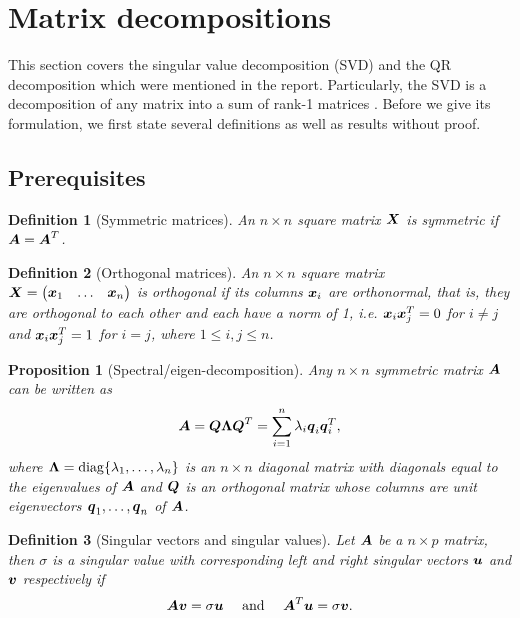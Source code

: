 \documentclass[12pt]{article}
\newtheorem{prop}{Proposition}[section]
\newtheorem{dfn}{Definition}[section]
\DeclareMathOperator{\diag}{diag}
\begin{document}
	\pagebreak
	
	\appendix %
	\section{\label{sec:svd}Matrix decompositions}
	This section covers the singular value decomposition (SVD) and the QR decomposition which were mentioned in the report. Particularly, the SVD is a decomposition of any matrix into a sum of rank-1 matrices \cite{Strang2019}. Before we give its formulation, we first state several definitions as well as results without proof.
	\subsection{Prerequisites}
	\begin{dfn}[Symmetric matrices]
		An $n\times n$ square matrix $\boldsymbol{X}$ is symmetric if $\boldsymbol{A}=\boldsymbol{A}^T$.
	\end{dfn}
	\vspace{1mm}
	\begin{dfn}[Orthogonal matrices]
		An $n\times n$ square matrix $\boldsymbol{X}=\begin{pmatrix}
			\boldsymbol{x}_1 & \ldots & \boldsymbol{x}_n
		\end{pmatrix}$ is orthogonal if its columns $\boldsymbol{x}_i$ are orthonormal, that is, they are orthogonal to each other and each have a norm of 1, i.e. $\boldsymbol{x}_i\boldsymbol{x}_j^T=0$ for $i\neq j$ and $\boldsymbol{x}_i\boldsymbol{x}_j^T=1$ for $i=j$, where $1\leq i,j\leq n$.
	\end{dfn}
	\vspace{1mm}
	\begin{prop}[Spectral/eigen-decomposition]
		Any $n\times n$ symmetric matrix $\boldsymbol{A}$ can be written as 
		$$\boldsymbol{A}=\boldsymbol{Q}\boldsymbol{\Lambda}\boldsymbol{Q}^T=\sum_{i=1}^{n}\lambda_i\boldsymbol{q}_i\boldsymbol{q}_i^T,$$
		where $\boldsymbol{\Lambda}=\diag\{\lm_1,\ldots,\lm_n\}$ is an $n\times n$ diagonal matrix with diagonals equal to the eigenvalues of $\boldsymbol{A}$ and $\boldsymbol{Q}$ is an orthogonal matrix whose columns are unit eigenvectors $\boldsymbol{q}_1,\ldots,\boldsymbol{q}_n$ of $\boldsymbol{A}$.
	\end{prop}
	\vspace{1mm}
	\begin{dfn}[Singular vectors and singular values]
		Let $\boldsymbol{A}$ be a $n\times p$ matrix, then $\sigma$ is a singular value with corresponding left and right singular vectors $\boldsymbol{u}$ and $\boldsymbol{v}$ respectively if
		$$\boldsymbol{A}\boldsymbol{v}=\sigma\boldsymbol{u} \quad \text{ and }\quad \boldsymbol{A}^T\boldsymbol{u}=\sigma\boldsymbol{v}.$$
	\end{dfn}
\end{document}
